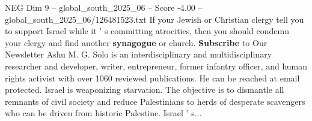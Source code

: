 \begin{textsample}{NEG Dim 9 – global\_south\_2025\_06 – Score -4.00 – global\_south\_2025\_06/126481523.txt}
If your Jewish or Christian clergy tell you to support Israel while it ' s committing atrocities, then you should condemn your clergy and find another \textbf{synagogue} or church. \textbf{Subscribe} to Our Newsletter Ashu M.
G.
Solo is an interdisciplinary and multidisciplinary researcher and developer, writer, entrepreneur, former infantry officer, and human rights activist with over 1060 reviewed publications.
He can be reached at email protected.
Israel is weaponizing starvation.
The objective is to dismantle all remnants of civil society and reduce Palestinians to herds of desperate scavengers who can be driven from historic Palestine.
Israel ' s...

\end{textsample}
